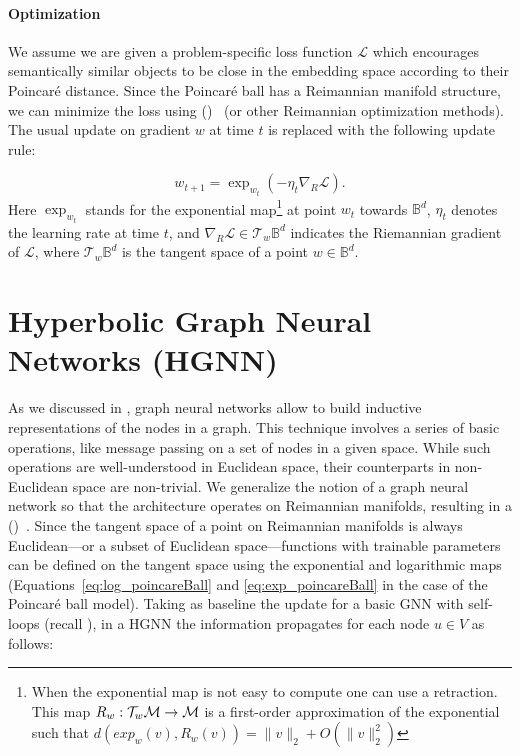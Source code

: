 \paragraph{Optimization}
We assume we are given a problem-specific loss function $\mathcal{L}$ which encourages semantically similar objects to be close in the embedding space according to their Poincaré distance. Since the Poincaré ball has a Reimannian manifold structure, we can minimize the loss using  ()~\cite{bonnabel2013RSGD} (or other Reimannian optimization methods). The usual update on gradient $w$ at time $t$ is replaced with the following update rule:

\begin{equation}
    w_{t+1} = \exp_{w_t}(-\eta_t\nabla_R\mathcal{L}).
\end{equation}
Here $\exp_{w_t}$ stands for the exponential map\footnote{When the exponential map is not easy to compute one can use a retraction. This map $R_w:\mathcal{T}_w\mathcal{M}\to\mathcal{M}$ is a first-order approximation of the exponential such that $d(exp_w(v), R_w(v))=\|v\|_2+O(\|v\|^2_2)$} at point $w_t$ towards $\mathbb{B}^d$, $\eta_t$ denotes the learning rate at time $t$, and $\nabla_R \mathcal{L} \in \mathcal{T}_{w}\mathbb{B}^d$ indicates the Riemannian gradient of $\mathcal{L}$, where $\mathcal{T}_{w}\mathbb{B}^d$ is the tangent space of a point $w \in \mathbb{B}^d$.  

\section{Hyperbolic Graph Neural Networks (HGNN)}
As we discussed in , graph neural networks allow to build inductive representations of the nodes in a graph. This technique involves a series of basic operations, like message passing on a set of nodes in a given space. While such operations are well-understood in Euclidean space, their counterparts in non-Euclidean space are non-trivial. We generalize the notion of a graph neural network so that the architecture operates on Reimannian manifolds, resulting in a  ()~\cite{liu2019HGNN}. Since the tangent space of a point on Reimannian manifolds is always Euclidean---or a subset of Euclidean space---functions with trainable parameters can be defined on the tangent space using the exponential and logarithmic maps (Equations~\eqref{eq:log_poincareBall} and \eqref{eq:exp_poincareBall} in the case of the Poincaré ball model). Taking as baseline the update for a basic GNN with self-loops (recall ), in a HGNN the information propagates for each node $u \in V$ as follows:

